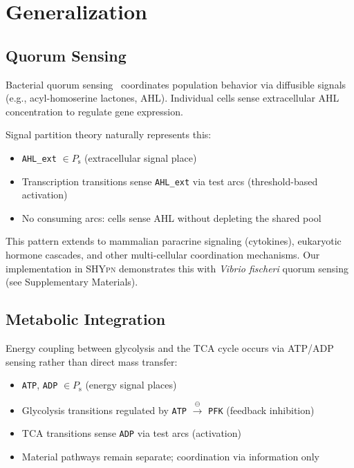 \documentclass[twocolumn,10pt]{article}
\newcommand{\Ps}{P_{\text{s}}}
\newcommand{\shypn}{\textsc{SHYpn}}
\begin{document}
\section{Generalization}

\subsection{Quorum Sensing}

Bacterial quorum sensing~\cite{miller2001quorum} coordinates population behavior via diffusible signals (e.g., acyl-homoserine lactones, AHL). Individual cells sense extracellular AHL concentration to regulate gene expression.

Signal partition theory naturally represents this:
\begin{itemize}
\item \texttt{AHL\_ext} $\in \Ps$ (extracellular signal place)
\item Transcription transitions sense \texttt{AHL\_ext} via test arcs (threshold-based activation)
\item No consuming arcs: cells sense AHL without depleting the shared pool
\end{itemize}

This pattern extends to mammalian paracrine signaling (cytokines), eukaryotic hormone cascades, and other multi-cellular coordination mechanisms. Our implementation in \shypn{} demonstrates this with \textit{Vibrio fischeri} quorum sensing~\cite{fuqua1994quorum} (see Supplementary Materials).

\subsection{Metabolic Integration}

Energy coupling between glycolysis and the TCA cycle occurs via ATP/ADP sensing rather than direct mass transfer:
\begin{itemize}
\item \texttt{ATP}, \texttt{ADP} $\in \Ps$ (energy signal places)
\item Glycolysis transitions regulated by \texttt{ATP} $\xrightarrow{\ominus}$ \texttt{PFK} (feedback inhibition)
\item TCA transitions sense \texttt{ADP} via test arcs (activation)
\item Material pathways remain separate; coordination via information only
\end{itemize}
\end{document}
